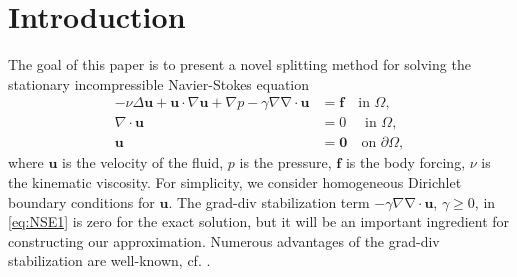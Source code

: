 \documentclass[3p]{elsarticle}
\def\V#1{\mathbf{#1}}
\newcommand{\divergence}{\mathrm{\nabla \cdot}}
\begin{document}
 \section{Introduction}\label{Sec-Intro}
 The goal of this paper is to present a novel splitting method for solving the stationary incompressible Navier-Stokes equation
\begin{align}
- \nu\Delta \V{u} 
+ \V{u} \cdot \nabla \V{u}  + \nabla p - \gamma \nabla \divergence \V{u} &= \V{f}  \quad \text{in }  \Omega, \label{eq:NSE1} \\
\nabla \cdot \V{u} &= 0 \quad \text{ in } \Omega, \label{eq:NSE2} \\
\V{u} & = \V{0} \quad \text{on } \partial \Omega,
\label{eq:NSE3}
\end{align}
where $\V{u}$ is the velocity of the fluid, $p$ is the pressure, $\V{f}$ is the body forcing, $\nu$ is the kinematic viscosity. For simplicity, we consider homogeneous Dirichlet boundary conditions for $\V{u}$. The grad-div stabilization term $- \gamma \nabla \divergence \V{u}$, $\gamma \ge 0$, in \eqref{eq:NSE1} is zero for the exact solution, but it will be an important ingredient for constructing our approximation. Numerous advantages of the grad-div stabilization are well-known, cf. \cite{JenJohLinReb2014,OlsReu2004,https://doi.org/10.1002/fld.3654,MOULIN2019718}. 
\end{document}
